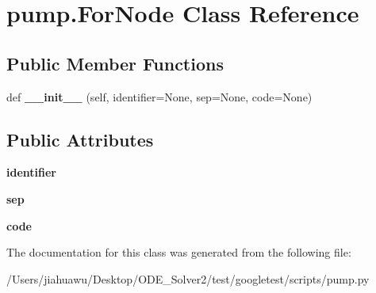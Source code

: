\hypertarget{classpump_1_1_for_node}{}\section{pump.\+For\+Node Class Reference}
\label{classpump_1_1_for_node}
\subsection*{Public Member Functions}
\begin{DoxyCompactItemize}
\item 
\mbox{\label{classpump_1_1_for_node_a9cf60468cacdb06acce35074ab2a2b55}} 
def {\bfseries \+\_\+\+\_\+init\+\_\+\+\_\+} (self, identifier=None, sep=None, code=None)
\end{DoxyCompactItemize}
\subsection*{Public Attributes}
\begin{DoxyCompactItemize}
\item 
\mbox{\label{classpump_1_1_for_node_a2444199e135e43696b3a006bd0d38982}} 
{\bfseries identifier}
\item 
\mbox{\label{classpump_1_1_for_node_a06b493278b3c1ad53363a2bcc3b8efb3}} 
{\bfseries sep}
\item 
\mbox{\label{classpump_1_1_for_node_afdb5f4f2a3bc772bbc6ea777dfde898e}} 
{\bfseries code}
\end{DoxyCompactItemize}


The documentation for this class was generated from the following file\+:\begin{DoxyCompactItemize}
\item 
/\+Users/jiahuawu/\+Desktop/\+O\+D\+E\+\_\+\+Solver2/test/googletest/scripts/pump.\+py\end{DoxyCompactItemize}
